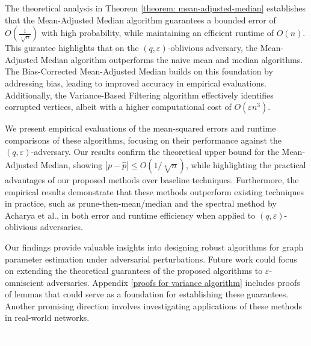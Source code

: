 \documentclass[10pt,onecolumn,letterpaper]{article}
\newcommand{\eps}{\varepsilon}
\begin{document}
The theoretical analysis in Theorem \ref{theorem: mean-adjusted-median} establishes that the Mean-Adjusted Median algorithm guarantees a bounded error of \(O\left(\frac{1}{\sqrt[4]{n}}\right)\) with high probability, while maintaining an efficient runtime of \(O(n)\). This gurantee highlights that on the $(q,\eps)$-oblivious adversary, the Mean-Adjusted Median algorithm outperforms the naive mean and median algorithms. The Bias-Corrected Mean-Adjusted Median builds on this foundation by addressing bias, leading to improved accuracy in empirical evaluations. Additionally, the Variance-Based Filtering algorithm effectively identifies corrupted vertices, albeit with a higher computational cost of \(O(\varepsilon n^3)\). 

We present empirical evaluations of the mean-squared errors and runtime comparisons of these algorithms, focusing on their performance against the \((q, \varepsilon)\)-adversary. Our results confirm the theoretical upper bound for the Mean-Adjusted Median, showing \(\left| p - \hat{p} \right| \leq O(1/\sqrt[4]{n})\), while highlighting the practical advantages of our proposed methods over baseline techniques. Furthermore, the empirical results demonstrate that these methods outperform existing techniques in practice, such as prune-then-mean/median and the spectral method by Acharya et al., in both error and runtime efficiency when applied to \((q, \varepsilon)\)-oblivious adversaries.

Our findings provide valuable insights into designing robust algorithms for graph parameter estimation under adversarial perturbations. Future work could focus on extending the theoretical guarantees of the proposed algorithms to \(\varepsilon\)-omniscient adversaries. Appendix \ref{proofs for variance algorithm} includes proofs of lemmas that could serve as a foundation for establishing these guarantees. Another promising direction involves investigating applications of these methods in real-world networks.

\textcolor{white}{Heon is the MVP}

{\small


}

\newpage
\appendix
\end{document}
